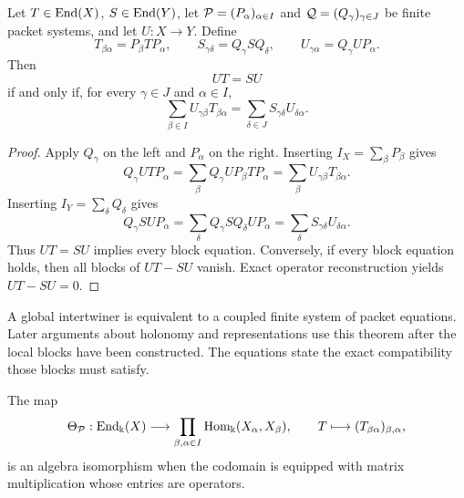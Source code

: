 \begin{theorem}
\label{thm:block-intertwining}
Let \(T\in\operatorname{End}(X)\), \(S\in\operatorname{End}(Y)\), let \(\mathcal P=(P_\alpha)_{\alpha\in I}\) and \(\mathcal Q=(Q_\gamma)_{\gamma\in J}\) be finite packet systems, and let \(U:X\to Y\).  Define
\[
T_{\beta\alpha}=P_\beta TP_\alpha,
\qquad
S_{\gamma\delta}=Q_\gamma SQ_\delta,
\qquad
U_{\gamma\alpha}=Q_\gamma UP_\alpha.
\]
Then
\[
\boxed{UT=SU}
\]
if and only if, for every \(\gamma\in J\) and \(\alpha\in I\),
\[
\boxed{
\sum_{\beta\in I}U_{\gamma\beta}T_{\beta\alpha}
=
\sum_{\delta\in J}S_{\gamma\delta}U_{\delta\alpha}.
}
\]
\end{theorem}

\begin{proof}
Apply \(Q_\gamma\) on the left and \(P_\alpha\) on the right.  Inserting \(I_X=\sum_\beta P_\beta\) gives
\[
Q_\gamma UTP_\alpha
=
\sum_\beta Q_\gamma UP_\beta TP_\alpha
=
\sum_\beta U_{\gamma\beta}T_{\beta\alpha}.
\]
Inserting \(I_Y=\sum_\delta Q_\delta\) gives
\[
Q_\gamma SUP_\alpha
=
\sum_\delta Q_\gamma SQ_\delta UP_\alpha
=
\sum_\delta S_{\gamma\delta}U_{\delta\alpha}.
\]
Thus \(UT=SU\) implies every block equation.  Conversely, if every block equation holds, then all blocks of \(UT-SU\) vanish.  Exact operator reconstruction yields \(UT-SU=0\).
\end{proof}

\begin{interpretation}
A global intertwiner is equivalent to a coupled finite system of packet equations.  Later arguments about holonomy and representations use this theorem after the local blocks have been constructed.  The equations state the exact compatibility those blocks must satisfy.
\end{interpretation}


\begin{theorem}
\label{thm:block-algebra}
The map
\[
\Theta_{\mathcal P}:\operatorname{End}_{\Bbbk}(X)
\longrightarrow
\prod_{\beta,\alpha\in I}\operatorname{Hom}_{\Bbbk}(X_\alpha,X_\beta),
\qquad
T\longmapsto(T_{\beta\alpha})_{\beta,\alpha},
\]
is an algebra isomorphism when the codomain is equipped with matrix multiplication whose entries are operators.
\end{theorem}

